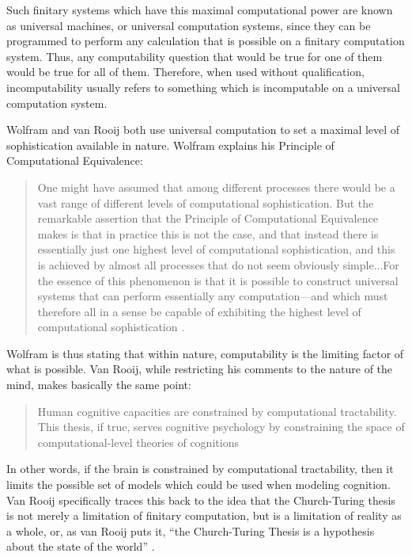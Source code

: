 Such finitary systems which have this maximal computational power are known as universal machines, or universal computation systems, since they can be programmed to perform any calculation that is possible on a finitary computation system.  Thus, any computability question that would be true for one of them would be true for all of them.  Therefore, when used without qualification, incomputability usually refers to something which is incomputable on a universal computation system.

Wolfram and van Rooij both use universal computation to set a maximal level of sophistication available in nature.  Wolfram explains his Principle of Computational Equivalence:

\begin{quote}
One might have assumed that among different processes there would be a vast range of different levels of computational sophistication.  But the remarkable assertion that the Principle of Computational Equivalence makes is that in practice this is not the case, and that instead there is essentially just one highest level of computational sophistication, and this is achieved by almost all processes that do not seem obviously simple...For the essence of this phenomenon is that it is possible to construct universal systems that can perform essentially any computation---and which must therefore all in a sense be capable of exhibiting the highest level of computational sophistication \citep[][p.~717]{wolfram2002}.
\end{quote}

Wolfram is thus stating that within nature, computability is the limiting factor of what is possible.  Van Rooij, while restricting his comments to the nature of the mind, makes basically the same point:

\begin{quote}
Human cognitive capacities are constrained by computational tractability.  This thesis, if true, serves cognitive psychology by constraining the space of computational-level theories of cognitions \citep[][p.~939]{vanrooij2008}
\end{quote}

In other words, if the brain is constrained by computational tractability, then it limits the possible set of models which could be used when modeling cognition.  Van Rooij specifically traces this back to the idea that the Church-Turing thesis is not merely a limitation of finitary computation, but is a limitation of reality as a whole, or, as van Rooij puts it, ``the Church-Turing Thesis is a hypothesis about the state of the world'' \citep[][p.~943]{vanrooij2008}.

